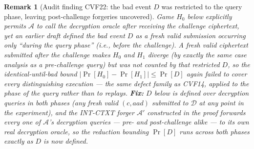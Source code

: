 \documentclass[11pt,a4paper]{article}
\newtheorem{remark}[theorem]{Remark}
\begin{document}
\begin{remark}[Audit finding CVF22: the bad event $D$ was restricted to the query phase, leaving post-challenge forgeries uncovered]
\label{rem:cvf22}
Game $H_0$ below explicitly permits $\mathcal{A}$ to call the decryption
oracle after receiving the challenge ciphertext, yet an earlier draft
defined the bad event $D$ as a fresh valid submission occurring only
``during the query phase'' (i.e., before the challenge). A fresh valid
ciphertext submitted \emph{after} the challenge makes $H_0$ and $H_1$
diverge (by exactly the same case analysis as a pre-challenge query) but
was not counted by that restricted $D$, so the identical-until-bad bound
$|\Pr[H_0]-\Pr[H_1]|\leq\Pr[D]$ again failed to cover every
distinguishing execution --- the same defect family as CVF14, applied to
the phase of the query rather than to replays. \textbf{Fix:} $D$ below is
defined over decryption queries in \emph{both} phases (any fresh valid
$(c,aad)$ submitted to $\mathcal{D}$ at any point in the experiment), and
the INT-CTXT forger $\mathcal{A}'$ constructed in the proof forwards
\emph{every} one of $\mathcal{A}$'s decryption queries --- pre- and
post-challenge alike --- to its own real decryption oracle, so the
reduction bounding $\Pr[D]$ runs across both phases exactly as $D$ is now
defined.
\end{remark}
\end{document}
